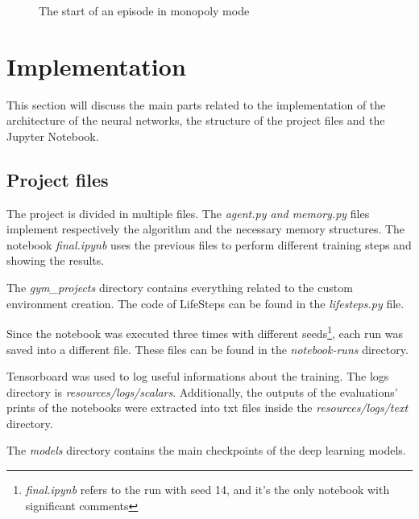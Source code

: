 \documentclass{article}
\begin{document}
\begin{figure}
  \centering
  \caption{The start of an episode in monopoly mode}
  \label{fig:A}
\end{figure}

\section{Implementation}
This section will discuss the main parts related to the implementation of the architecture of the neural networks, the structure of the project files and the Jupyter Notebook.

\subsection{Project files}
The project is divided in multiple files. The \textit{agent.py and memory.py} files implement respectively the algorithm and the necessary memory structures. The notebook \textit{final.ipynb} uses the previous files to perform different training steps and showing the results.

The \textit{gym\_projects} directory contains everything related to the custom environment creation. The code of LifeSteps can be found in the \textit{lifesteps.py} file.

Since the notebook was executed three times with different seeds\footnote{\textit{final.ipynb} refers to the run with seed 14, and it's the only notebook with significant comments}, each run was saved into a different file. These files can be found in the \textit{notebook-runs} directory.

Tensorboard was used to log useful informations about the training. The logs directory is \textit{resources/logs/scalars}. Additionally, the outputs of the evaluations' prints of the notebooks were extracted into txt files inside the \textit{resources/logs/text} directory.

The \textit{models} directory contains the main checkpoints of the deep learning models.
\end{document}
